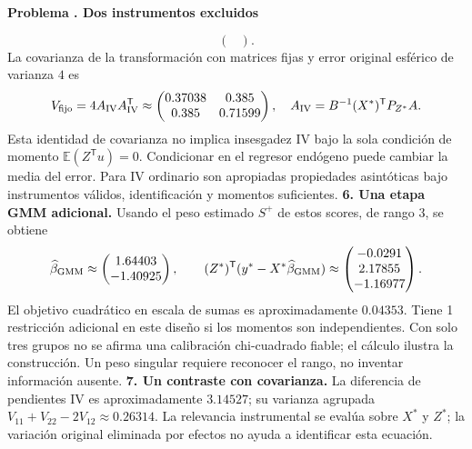\documentclass[11pt,a4paper]{article}
\newcommand{\E}{\mathbb E}
\newcommand{\T}{^{\mathsf T}}
\theoremstyle{definition}
\newcounter{problema}
\newenvironment{resuelto}[1]{\refstepcounter{problema}\par\medskip\Needspace{6\baselineskip}\textbf{Problema \theproblema. #1}\par}{\par\medskip}
\begin{document}
\begin{resuelto}{Dos instrumentos excluidos}
\[\begin{pmatrix}
\end{pmatrix}.
\]
La covarianza de la transformación con matrices fijas y error original esférico de varianza $4$ es
\[
V_{\rm fijo}=4A_{\rm IV}A_{\rm IV}\T\approx\begin{pmatrix}
0.37038&0.385\\0.385&0.71599
\end{pmatrix},\quad A_{\rm IV}=B^{-1}(X^*)\T P_{Z^*}A.
\]
Esta identidad de covarianza no implica insesgadez IV bajo la sola condición de momento $\E(Z\T u)=0$. Condicionar en el regresor endógeno puede cambiar la media del error. Para IV ordinario son apropiadas propiedades asintóticas bajo instrumentos válidos, identificación y momentos suficientes.
\textbf{6. Una etapa GMM adicional.} Usando el peso estimado $S^+$ de estos scores, de rango $3$, se obtiene
\[
\widehat\beta_{\rm GMM}\approx\begin{pmatrix}
1.64403\\-1.40925
\end{pmatrix},\qquad
(Z^*)\T(y^*-X^*\widehat\beta_{\rm GMM})\approx\begin{pmatrix}
-0.0291\\2.17855\\-1.16977
\end{pmatrix}.
\]
El objetivo cuadrático en escala de sumas es aproximadamente $0.04353$. Tiene 1 restricción adicional en este diseño si los momentos son independientes. Con solo tres grupos no se afirma una calibración chi-cuadrado fiable; el cálculo ilustra la construcción. Un peso singular requiere reconocer el rango, no inventar información ausente.
\textbf{7. Un contraste con covarianza.} La diferencia de pendientes IV es aproximadamente $3.14527$; su varianza agrupada $V_{11}+V_{22}-2V_{12}\approx0.26314$. La relevancia instrumental se evalúa sobre $X^*$ y $Z^*$; la variación original eliminada por efectos no ayuda a identificar esta ecuación.
\end{resuelto}
\end{document}
